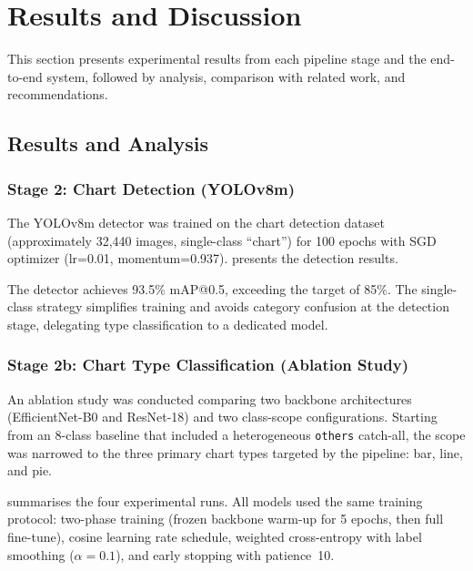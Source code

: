 \section{Results and Discussion}

This section presents experimental results from each pipeline stage and the end-to-end
system, followed by analysis, comparison with related work, and recommendations.

\subsection{Results and Analysis}

\subsubsection{Stage 2: Chart Detection (YOLOv8m)}

The YOLOv8m detector was trained on the chart detection dataset (approximately 32,440
images, single-class ``chart'') for 100 epochs with SGD optimizer (lr=0.01, momentum=0.937).
 presents the detection results.

\begin{table}[htbp]
\centering
\caption{YOLOv8m chart detection results.}
\label{tab:yolo}

\end{table}

The detector achieves 93.5\% mAP@0.5, exceeding the target of 85\%. The single-class
strategy simplifies training and avoids category confusion at the detection stage,
delegating type classification to a dedicated model.

\subsubsection{Stage 2b: Chart Type Classification (Ablation Study)}
\label{sec:results_classifier}

An ablation study was conducted comparing two backbone architectures (EfficientNet-B0
and ResNet-18) and two class-scope configurations. Starting from an 8-class baseline
that included a heterogeneous \texttt{others} catch-all, the scope was narrowed to
the three primary chart types targeted by the pipeline: bar, line, and pie.

 summarises the four experimental runs. All models used
the same training protocol: two-phase training (frozen backbone warm-up for 5 epochs,
then full fine-tune), cosine learning rate schedule, weighted cross-entropy with label
smoothing ($\alpha=0.1$), and early stopping with patience~10.

